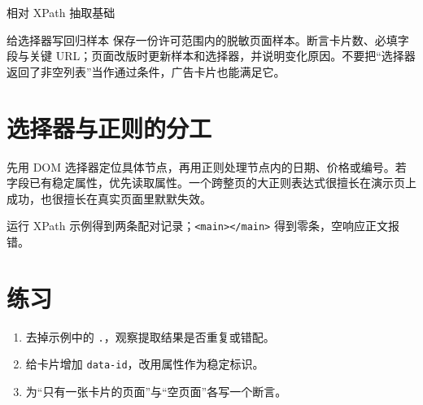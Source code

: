 \begin{example}{相对 XPath 抽取}{基础}
\end{example}

\begin{method}{给选择器写回归样本}
保存一份许可范围内的脱敏页面样本。断言卡片数、必填字段与关键 URL；页面改版时更新样本和选择器，并说明变化原因。不要把“选择器返回了非空列表”当作通过条件，广告卡片也能满足它。
\end{method}

\section{选择器与正则的分工}
先用 DOM 选择器定位具体节点，再用正则处理节点内的日期、价格或编号。若字段已有稳定属性，优先读取属性。一个跨整页的大正则表达式很擅长在演示页上成功，也很擅长在真实页面里默默失效。

\begin{tcolorbox}[title=本章验收,colframe=Teal,colback=Teal!3]
运行 XPath 示例得到两条配对记录；\texttt{<main></main>} 得到零条，空响应正文报错。
\end{tcolorbox}

\section{练习}
\begin{enumerate}[label=\arabic*.]
\item 去掉示例中的 \texttt{.}，观察提取结果是否重复或错配。
\item 给卡片增加 \texttt{data-id}，改用属性作为稳定标识。
\item 为“只有一张卡片的页面”与“空页面”各写一个断言。
\end{enumerate}
